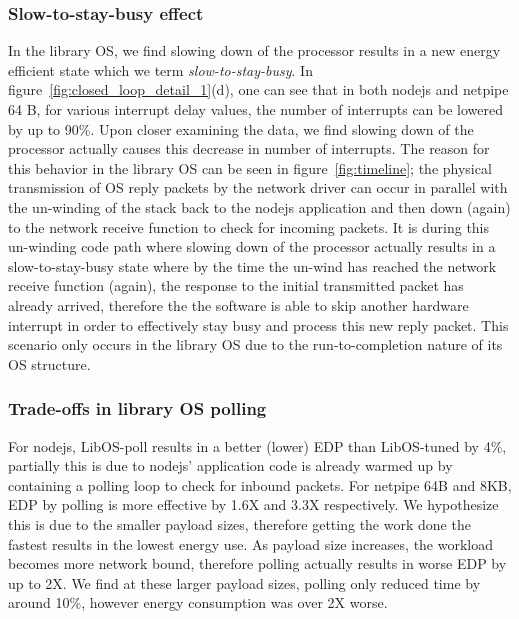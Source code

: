 \subsubsection{Slow-to-stay-busy effect}
In the library OS, we find slowing down of the processor results in a new energy efficient state which we term \textit{slow-to-stay-busy}. In figure~\ref{fig:closed_loop_detail_1}(d), one can see that in both nodejs and netpipe 64 B, for various interrupt delay values, the number of interrupts can be lowered by up to 90\%. Upon closer examining the data, we find slowing down of the processor actually causes this decrease in number of interrupts. The reason for this behavior in the library OS can be seen in figure~\ref{fig:timeline}; the physical transmission of OS reply packets by the network driver can occur in parallel with the un-winding of the stack back to the nodejs application and then down (again) to the network receive function to check for incoming packets. It is during this un-winding code path where slowing down of the processor actually results in a slow-to-stay-busy state where by the time the un-wind has reached the network receive function (again), the response to the initial transmitted packet has already arrived, therefore the the software is able to skip another hardware interrupt in order to effectively stay busy and process this new reply packet. This scenario only occurs in the library OS due to the run-to-completion nature of its OS structure.



\subsubsection{Trade-offs in library OS polling}
 For nodejs, LibOS-poll results in a better (lower) EDP than LibOS-tuned by 4\%, partially this is due to nodejs' application code is already warmed up by containing a polling loop to check for inbound packets. For netpipe 64B and 8KB, EDP by polling is more effective by 1.6X and 3.3X respectively. We hypothesize this is due to the smaller payload sizes, therefore getting the work done the fastest results in the lowest energy use. As payload size increases, the workload becomes more network bound, therefore polling actually results in worse EDP by up to 2X. We find at these larger payload sizes, polling only reduced time by around 10\%, however energy consumption was over 2X worse.

